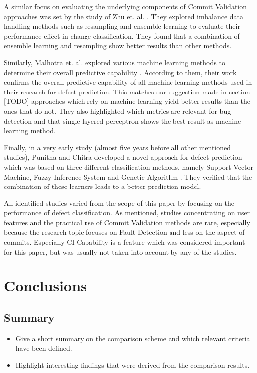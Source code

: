 A similar focus on evaluating the underlying components of Commit Validation approaches was set by the study of Zhu et. al. \cite{Zhu2018}. They explored imbalance data handling methods such as resampling and ensemble learning to evaluate their performance effect in change classification. They found that a combination of ensemble learning and resampling show better results than other methods. 

Similarly, Malhotra et. al. explored various machine learning methods to determine their overall predictive capability \cite{Malhotra2017}. According to them, their work confirms the overall predictive capability of all machine learning methods used in their research for defect prediction. This matches our suggestion made in section [TODO] approaches which rely on machine learning yield better results than the ones that do not. They also highlighted which metrics are relevant for bug detection and that single layered perceptron shows the best result as machine learning method.

Finally, in a very early study (almost five years before all other mentioned studies), Punitha and Chitra developed a novel approach for defect prediction which was based on three different classification methods, namely Support Vector Machine, Fuzzy Inference System and Genetic Algorithm \cite{Punitha2013}. They verified that the combination of these learners leads to a better prediction model.

All identified studies varied from the scope of this paper by focusing on the performance of defect classification. As mentioned, studies concentrating on user features and the practical use of Commit Validation methods are rare, especially because the research topic focuses on Fault Detection and less on the aspect of commits. Especially CI Capability is a feature which was considered important for this paper, but was usually not taken into account by any of the studies.

\section{Conclusions}
\label{sec:conclusions}

\subsection{Summary}
\begin{itemize}
	\item Give a short summary on the comparison scheme and which relevant criteria have been defined.
	\item Highlight interesting findings that were derived from the comparison results.
\end{itemize}

